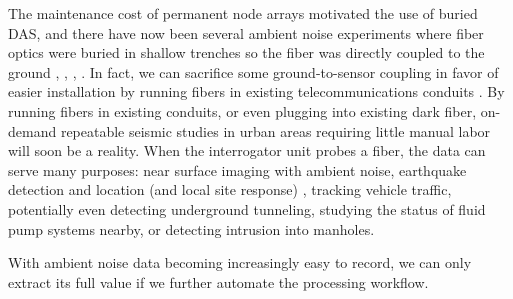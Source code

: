 \documentclass[11pt]{article}
\begin{document}
\par
The maintenance cost of permanent node arrays motivated the use of buried DAS, and there have now been several ambient noise experiments where fiber optics were buried in shallow trenches so the fiber was directly coupled to the ground \cite{AjoFranklin2015}, \cite{Martin2015}, \cite{Martin2016}, \cite{Zeng2017}. In fact, we can sacrifice some ground-to-sensor coupling in favor of easier installation by running fibers in existing telecommunications conduits \cite{Martin2017}. By running fibers in existing conduits, or even plugging into existing dark fiber, on-demand repeatable seismic studies in urban areas requiring little manual labor will soon be a reality. When the interrogator unit probes a fiber, the data can serve many purposes: near surface imaging with ambient noise, earthquake detection and location (and local site response) \cite{Martin2017}, tracking vehicle traffic, potentially even detecting underground tunneling, studying the status of fluid pump systems nearby, or detecting intrusion into manholes. 
\par
With ambient noise data becoming increasingly easy to record, we can only extract its full value if we further automate the processing workflow.

\vspace{-0.5cm}
\end{document}
